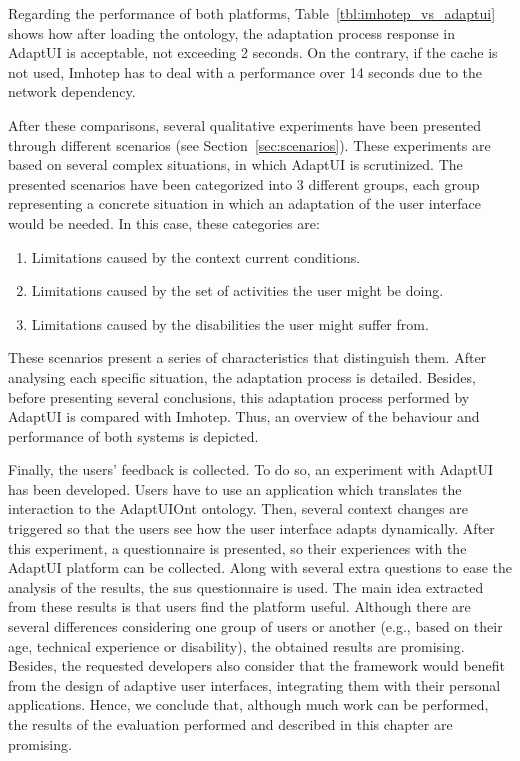 Regarding the performance of both platforms, Table~\ref{tbl:imhotep_vs_adaptui}
shows how after loading the ontology, the adaptation process response in AdaptUI
is acceptable, not exceeding 2 seconds. On the contrary, if the cache is not
used, Imhotep has to deal with a performance over 14 seconds due to the network
dependency.


After these comparisons, several qualitative experiments have been presented 
through different scenarios (see Section~\ref{sec:scenarios}). These experiments 
are based on several complex situations, in which AdaptUI is scrutinized.
The presented scenarios have been categorized into 3 different groups, each 
group representing a concrete situation in which an adaptation of the user 
interface would be needed. In this case, these categories are:

\begin{enumerate}[label=\alph*)]
  \item Limitations caused by the context current conditions.
  \item Limitations caused by the set of activities the user might be doing.
  \item Limitations caused by the disabilities the user might suffer from.
\end{enumerate}

These scenarios present a series of characteristics that distinguish them. After
analysing each specific situation, the adaptation process is detailed. Besides,
before presenting several conclusions, this adaptation process performed by 
AdaptUI is compared with Imhotep. Thus, an overview of the behaviour and 
performance of both systems is depicted.

Finally, the users' feedback is collected. To do so, an experiment with AdaptUI 
has been developed. Users have to use an application which translates the 
interaction to the AdaptUIOnt ontology. Then, several context changes are 
triggered so that the users see how the user interface adapts dynamically. After 
this experiment, a questionnaire is presented, so their experiences with the 
AdaptUI platform can be collected. Along with several extra questions to ease 
the analysis of the results, the \ac{sus} questionnaire is used. The main idea 
extracted from these results is that users find the platform useful. Although 
there are several differences considering one group of users or another (e.g., 
based on their age, technical experience or disability), the obtained results 
are promising. Besides, the requested developers also consider that the 
framework would benefit from the design of adaptive user interfaces, integrating 
them with their personal applications. Hence, we conclude that, although much work 
can be performed, the results of the evaluation performed and described in this 
chapter are promising.
